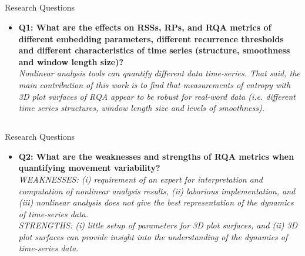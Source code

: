 \subsection{}
{

\begin{frame}{Research Questions}

\begin{itemize}
	\item \textbf{ 
	Q1: What are the effects on RSSs, RPs, and RQA metrics
	of different embedding parameters, different recurrence thresholds 
	and different characteristics of time series 
	(structure, smoothness and window length size)?
	} \\
	\textit{
Nonlinear analysis tools can quantify different
data time-series. That said, the main contribution of this work 
is to find that measurements of entropy with 3D plot surfaces of RQA 
appear to be robust for real-word data (i.e. different time series
structures, window length size and levels of smoothness).
}

\end{itemize}

\end{frame}
}




\subsection{}
{

\begin{frame}{Research Questions}

\begin{itemize}
	\item \textbf{ 
	Q2: What are the weaknesses and strengths of 
	RQA metrics when quantifying movement variability?	
} \\
	\textit{
WEAKNESSES: (i) requirement of an expert for interpretation and 
computation of nonlinear analysis results, 
(ii) laborious implementation, and 
(iii) nonlinear analysis does not give the best representation
of the dynamics of time-series data. \\
STRENGTHS: (i) little setup of parameters for 3D plot surfaces, and
(ii) 3D plot surfaces can provide insight into the understanding
of the dynamics of time-series data.
}

\end{itemize}

\end{frame}
}



